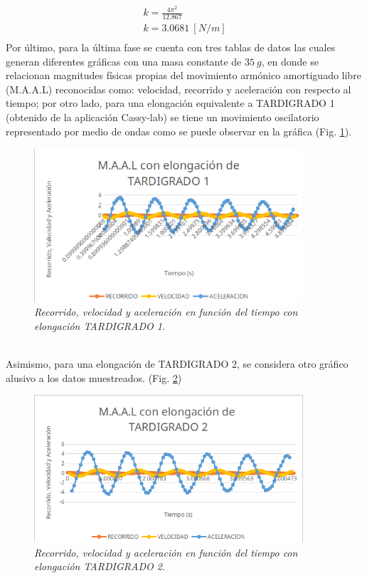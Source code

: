 \documentclass[spanish,notitlepage,letterpaper, 12pt]{article}
\begin{document}
\begin{align*}
    k=\frac{4\pi^2}{12.867}\\
    k=3.0681 \ [N/m]\\
\end{align*}
Por último, para la última fase se cuenta con tres tablas de datos las cuales generan diferentes gráficas con una masa constante de $35 \ g$, en donde se relacionan magnitudes físicas propias del movimiento armónico amortiguado libre (M.A.A.L) reconocidas como: velocidad, recorrido y aceleración con
respecto al tiempo; por otro lado, para una elongación equivalente a TARDIGRADO 1 (obtenido de la aplicación Cassy-lab) se tiene un movimiento oscilatorio representado por medio de ondas como se puede observar en la gráfica (Fig. \ref{Figura 4}).
\begin{figure}[h]
    \centering
    \includegraphics[width=10.0cm]{images/tardigrado1.png}
    \caption{\textit{Recorrido, velocidad y aceleración en función del tiempo con elongación TARDIGRADO 1.}}
    \label{Figura 4}
\end{figure}
\\
Asimismo, para una elongación de TARDIGRADO 2, se considera otro gráfico alusivo a los datos muestreados. (Fig. \ref{Figura 5})
\begin{figure}[h]
    \centering
    \includegraphics[width=10.0cm]{images/tardigrado2.png}
    \caption{\textit{Recorrido, velocidad y aceleración en función del tiempo con elongación TARDIGRADO 2.}}
    \label{Figura 5}
\end{figure}
\end{document}
